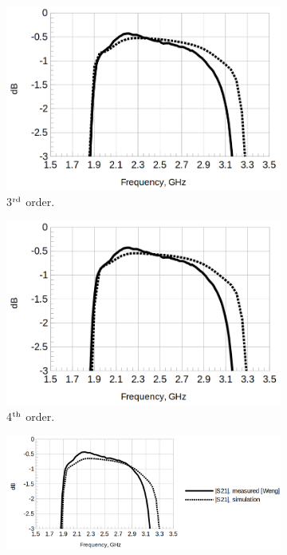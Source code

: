 \documentclass[titlepage]{article}
\renewcommand\_{\textunderscore\linebreak[1]}
\begin{document}
\begin{figure}[p]
\begin{subfigure}{0.45\textwidth}
     \includegraphics[width=\linewidth]{../regression/OpenParEM3D/microstrip/filter_study/screenshots/microstrip_filter_3rd_order_zoom.png}
     \caption{3$^{\textnormal{rd}}$ order.}
  \end{subfigure}
  \begin{subfigure}{0.45\textwidth}
     \includegraphics[width=\linewidth]{../regression/OpenParEM3D/microstrip/filter_study/screenshots/microstrip_filter_4th_order_zoom.png}
     \caption{4$^{\textnormal{th}}$ order.}
  \end{subfigure}
  \par\bigskip
  \begin{subfigure}{0.72\textwidth}
     \includegraphics[width=\linewidth]{../regression/OpenParEM3D/microstrip/filter_study/screenshots/microstrip_filter_5th_order_zoom.png}

\end{subfigure}
\end{figure}
\end{document}
